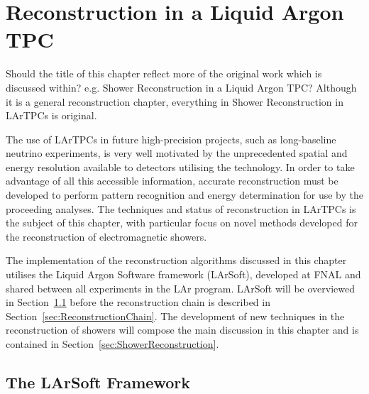 
\graphicspath{{LArTPCReconstruction/Figs/}}

\chapter{Reconstruction in a Liquid Argon TPC}\label{chap:LArTPCReconstruction}

{\color{red} Should the title of this chapter reflect more of the original work which is discussed within?  e.g. Shower Reconstruction in a Liquid Argon TPC?  Although  it is a general reconstruction chapter, everything in Shower Reconstruction in LArTPCs is original.}

The use of LArTPCs in future high-precision projects, such as long-baseline neutrino experiments, is very well motivated by the unprecedented spatial and energy resolution available to detectors utilising the technology.  In order to take advantage of all this accessible information, accurate reconstruction must be developed to perform pattern recognition and energy determination for use by the proceeding analyses.  The techniques and status of reconstruction in LArTPCs is the subject of this chapter, with particular focus on novel methods developed for the reconstruction of electromagnetic showers.

The implementation of the reconstruction algorithms discussed in this chapter utilises the Liquid Argon Software framework (LArSoft), developed at FNAL and shared between all experiments in the LAr program.  LArSoft will be overviewed in Section~\ref{sec:LArSoft} before the reconstruction chain is described in Section~\ref{sec:ReconstructionChain}.  The development of new techniques in the reconstruction of showers will compose the main discussion in this chapter and is contained in Section~\ref{sec:ShowerReconstruction}.

\section{The LArSoft Framework}\label{sec:LArSoft}

